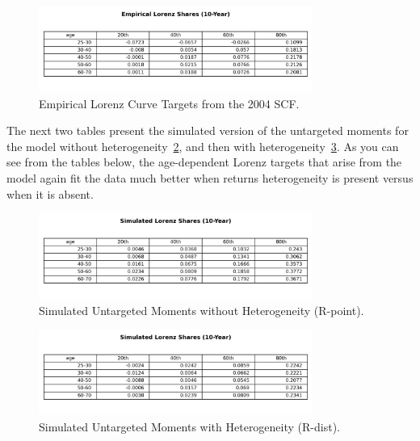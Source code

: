 \begin{figure}[h]
\centering
\includegraphics[width=0.8\textwidth]{Tables/Emp_Lorenz_10yr_LCrrDistNetWorth.png}
\caption{Empirical Lorenz Curve Targets from the 2004 SCF.}
\label{fig:EmpLorenzTar}
\end{figure}

\par The next two tables present the simulated version of the untargeted moments for the model without heterogeneity~\ref{fig:SimLorenzTarPoint}, and then with heterogeneity~\ref{fig:SimLorenzTarDist}. As you can see from the tables below, the age-dependent Lorenz targets that arise from the model again fit the data much better when returns heterogeneity is present versus when it is absent.

\begin{figure}[htbp]
\centering
\includegraphics[width=0.8\textwidth]{Tables/Sim_Lorenz_10yr_LCrrPointNetWorth.png}
\caption{Simulated Untargeted Moments without Heterogeneity (R-point).}
\label{fig:SimLorenzTarPoint}
\end{figure}

\begin{figure}[htbp]
\centering
\includegraphics[width=0.8\textwidth]{Tables/Sim_Lorenz_10yr_LCrrDistNetWorth.png}
\caption{Simulated Untargeted Moments with Heterogeneity (R-dist).}
\label{fig:SimLorenzTarDist}
\end{figure}



\par 





